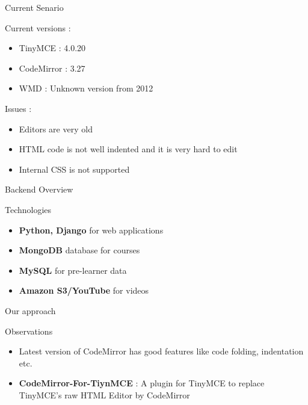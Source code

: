 \documentclass{beamer}
\begin{document}
	\begin{frame}{Current Senario }
		\begin{block}{Current versions : }
			\begin{itemize}
				\item TinyMCE : 4.0.20
				\item CodeMirror : 3.27
				\item WMD : Unknown version from 2012
			\end{itemize}
		\end{block}
		\begin{block}{Issues : }
			\begin{itemize}
				\item Editors are very old
				\item HTML code is not well indented and it is very hard to edit
				\item Internal CSS is not supported
			\end{itemize}
		\end{block}
	\end{frame}
	
	\begin{frame}{Backend Overview}
		\begin{block}{Technologies}
			\begin{itemize}
				\item \textbf{Python, Django} for web applications
				\item \textbf{MongoDB} database for courses
				\item \textbf{MySQL} for pre-learner data
				\item \textbf{Amazon S3/YouTube} for videos
			\end{itemize}
		\end{block}
	\end{frame}
	
	\begin{frame}{Our approach }
		\begin{block}{Observations}
			\begin{itemize}
				\item Latest version of CodeMirror has good features like code folding, indentation etc.
				\item \textbf{CodeMirror-For-TiynMCE} : A plugin for TinyMCE to replace TinyMCE's raw HTML Editor by CodeMirror
			\end{itemize}
		\end{block}
	\end{frame}
	
\end{document}
